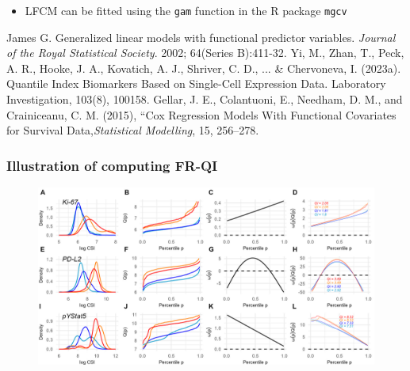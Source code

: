 \documentclass[t,8pt]{beamer}
\begin{document}
{\begin{itemize}
 \item LFCM can be fitted using the \texttt{gam} function in the R package \texttt{mgcv}   
		\end{itemize}
\begin{thebibliography}{ }
\begin{footnotesize}
James G. Generalized linear models with functional predictor variables. \textit{Journal of the Royal Statistical Society}. 2002; 64(Series B):411-32.	
Yi, M., Zhan, T., Peck, A. R., Hooke, J. A., Kovatich, A. J., Shriver, C. D., ... & Chervoneva, I. (2023a). Quantile Index Biomarkers Based on Single-Cell Expression Data. Laboratory Investigation, 103(8), 100158.
Gellar, J. E., Colantuoni, E., Needham, D. M., and Crainiceanu, C. M. (2015), “Cox Regression Models With Functional Covariates for Survival Data,\textit{Statistical Modelling}, 15, 256–278.
\end{footnotesize}
\end{thebibliography}			

}		

	
	\frame
	{\frametitle{Illustration of computing FR-QI}
		\begin{figure}
                \includegraphics[width=4.8in] {Figures/computingFRQI.jpeg}
		\end{figure} 
	}

\end{document}

